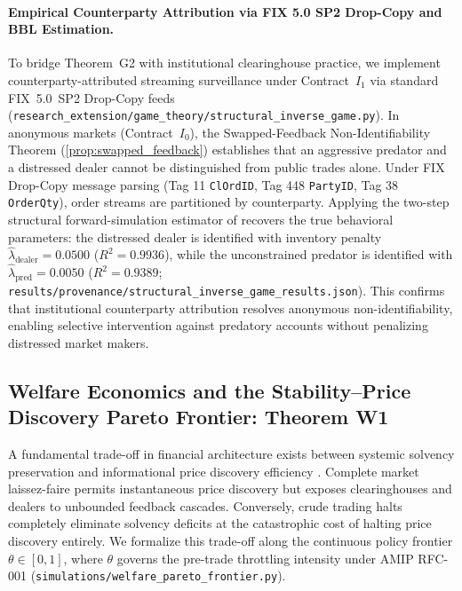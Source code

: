 \documentclass[10pt,twocolumn,letterpaper]{article}
\theoremstyle{definition}
\theoremstyle{remark}
\begin{document}
\paragraph{Empirical Counterparty Attribution via FIX 5.0 SP2 Drop-Copy and BBL Estimation.}
To bridge Theorem~G2 with institutional clearinghouse practice, we implement counterparty-attributed streaming surveillance under Contract~$I_1$ via standard FIX~5.0~SP2 Drop-Copy feeds (\texttt{research\_extension/game\_theory/structural\_inverse\_game.py}). In anonymous markets (Contract~$I_0$), the Swapped-Feedback Non-Identifiability Theorem (\cref{prop:swapped_feedback}) establishes that an aggressive predator and a distressed dealer cannot be distinguished from public trades alone. Under FIX Drop-Copy message parsing (Tag 11 \texttt{ClOrdID}, Tag 448 \texttt{PartyID}, Tag 38 \texttt{OrderQty}), order streams are partitioned by counterparty. Applying the two-step structural forward-simulation estimator of \citet{bajari2007estimating} recovers the true behavioral parameters: the distressed dealer is identified with inventory penalty $\hat{\lambda}_{\text{dealer}} = 0.0500$ ($R^2 = 0.9936$), while the unconstrained predator is identified with $\hat{\lambda}_{\text{pred}} = 0.0050$ ($R^2 = 0.9389$; \texttt{results/provenance/structural\_inverse\_game\_results.json}). This confirms that institutional counterparty attribution resolves anonymous non-identifiability, enabling selective intervention against predatory accounts without penalizing distressed market makers.

\subsection{Welfare Economics and the Stability--Price Discovery Pareto Frontier: Theorem W1}
\label{sec:welfare_pareto_frontier}
A fundamental trade-off in financial architecture exists between systemic solvency preservation and informational price discovery efficiency \citep{grossman1980impossibility,kyle1985continuous}. Complete market laissez-faire permits instantaneous price discovery but exposes clearinghouses and dealers to unbounded feedback cascades. Conversely, crude trading halts completely eliminate solvency deficits at the catastrophic cost of halting price discovery entirely.
We formalize this trade-off along the continuous policy frontier $\theta \in [0, 1]$, where $\theta$ governs the pre-trade throttling intensity under AMIP RFC-001 (\texttt{simulations/welfare\_pareto\_frontier.py}).
\end{document}
